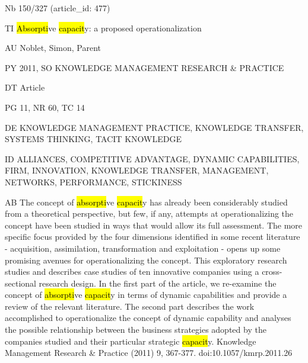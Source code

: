 \documentclass[a4paper]{article}
\begin{document}
\vspace*{-2cm}
Nb \tabto{0cm}150/327 (article\_id: 477)\par
TI \tabto{0cm}\hl{Absorpti}ve \hl{capacit}y: a proposed operationalization\par
AU \tabto{0cm}Noblet, Simon, Parent\par
PY \tabto{0cm}2011, SO KNOWLEDGE MANAGEMENT RESEARCH \& PRACTICE\par
DT \tabto{0cm}Article\par
PG \tabto{0cm}11, NR 60, TC 14\par
DE \tabto{0cm}KNOWLEDGE MANAGEMENT PRACTICE, KNOWLEDGE TRANSFER, SYSTEMS THINKING, TACIT KNOWLEDGE\par
ID \tabto{0cm}ALLIANCES, COMPETITIVE ADVANTAGE, DYNAMIC CAPABILITIES, FIRM, INNOVATION, KNOWLEDGE TRANSFER, MANAGEMENT, NETWORKS, PERFORMANCE, STICKINESS\par
AB \tabto{0cm}The concept of \hl{absorpti}ve \hl{capacit}y has already been considerably studied from a theoretical perspective, but few, if any, attempts at operationalizing the concept have been studied in ways that would allow its full assessment. The more specific focus provided by the four dimensions identified in some recent literature - acquisition, assimilation, transformation and exploitation - opens up some promising avenues for operationalizing the concept. This exploratory research studies and describes case studies of ten innovative companies using a cross-sectional research design. In the first part of the article, we re-examine the concept of \hl{absorpti}ve \hl{capacit}y in terms of dynamic capabilities and provide a review of the relevant literature. The second part describes the work accomplished to operationalize the concept of dynamic capability and analyses the possible relationship between the business strategies adopted by the companies studied and their particular strategic \hl{capacit}y. Knowledge Management Research \& Practice (2011) 9, 367-377. doi:10.1057/kmrp.2011.26\par
\clearpage
\end{document}
